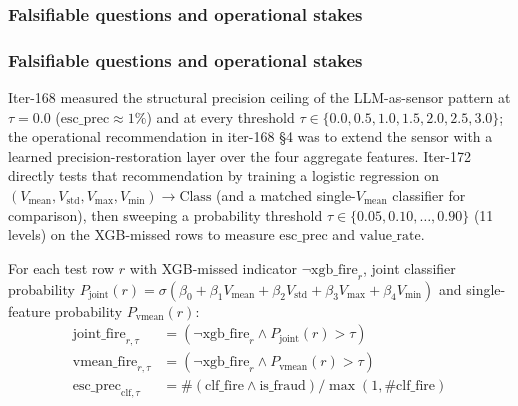 
\subsubsection{Falsifiable questions and operational stakes}\label{sec:p8-iter172-ensemble}

\subsubsection{Falsifiable questions and operational stakes}
Iter-168 measured the structural precision ceiling of the LLM-as-sensor
pattern at $\tau = 0.0$ ($\text{esc\_prec} \approx 1\%$) and at every
threshold $\tau \in \{0.0, 0.5, 1.0, 1.5, 2.0, 2.5, 3.0\}$; the
operational recommendation in iter-168 \S4 was to extend the sensor with
a learned precision-restoration layer over the four aggregate
features. Iter-172 directly tests that recommendation by training a
logistic regression on $(V_\mathrm{mean}, V_\mathrm{std}, V_\mathrm{max},
V_\mathrm{min}) \to \text{Class}$ (and a matched single-$V_\mathrm{mean}$
classifier for comparison), then sweeping a probability threshold
$\tau \in \{0.05, 0.10, \dots, 0.90\}$ (11 levels) on the XGB-missed
rows to measure $\text{esc\_prec}$ and $\text{value\_rate}$.

For each test row $r$ with XGB-missed indicator
$\neg \text{xgb\_fire}_r$, joint classifier probability
$P_\mathrm{joint}(r) = \sigma(\beta_0 + \beta_1 V_\mathrm{mean} +
\beta_2 V_\mathrm{std} + \beta_3 V_\mathrm{max} + \beta_4 V_\mathrm{min})$
and single-feature probability $P_\mathrm{vmean}(r)$:
\begin{align*}
\text{joint\_fire}_{r,\tau} &= (\neg \text{xgb\_fire}_r \wedge P_\mathrm{joint}(r) > \tau) \\
\text{vmean\_fire}_{r,\tau} &= (\neg \text{xgb\_fire}_r \wedge P_\mathrm{vmean}(r) > \tau) \\
\text{esc\_prec}_{\text{clf},\tau} &= \#(\text{clf\_fire} \wedge \text{is\_fraud}) /
   \max(1, \#\text{clf\_fire})
\end{align*}

